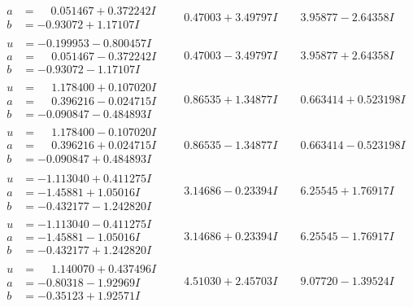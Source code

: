 \documentclass[1p]{elsarticle_modified}
\theoremstyle{definition}
\begin{document}
$$\begin{array}{c|c|c}
\begin{aligned}
a &= \phantom{-}0.051467 + 0.372242 I \\
b &= -0.93072 + 1.17107 I\end{aligned}
 & \phantom{-}0.47003 + 3.49797 I & \phantom{-}3.95877 - 2.64358 I \\ \hline\begin{aligned}
u &= -0.199953 - 0.800457 I \\
a &= \phantom{-}0.051467 - 0.372242 I \\
b &= -0.93072 - 1.17107 I\end{aligned}
 & \phantom{-}0.47003 - 3.49797 I & \phantom{-}3.95877 + 2.64358 I \\ \hline\begin{aligned}
u &= \phantom{-}1.178400 + 0.107020 I \\
a &= \phantom{-}0.396216 - 0.024715 I \\
b &= -0.090847 - 0.484893 I\end{aligned}
 & \phantom{-}0.86535 + 1.34877 I & \phantom{-}0.663414 + 0.523198 I \\ \hline\begin{aligned}
u &= \phantom{-}1.178400 - 0.107020 I \\
a &= \phantom{-}0.396216 + 0.024715 I \\
b &= -0.090847 + 0.484893 I\end{aligned}
 & \phantom{-}0.86535 - 1.34877 I & \phantom{-}0.663414 - 0.523198 I \\ \hline\begin{aligned}
u &= -1.113040 + 0.411275 I \\
a &= -1.45881 + 1.05016 I \\
b &= -0.432177 - 1.242820 I\end{aligned}
 & \phantom{-}3.14686 - 0.23394 I & \phantom{-}6.25545 + 1.76917 I \\ \hline\begin{aligned}
u &= -1.113040 - 0.411275 I \\
a &= -1.45881 - 1.05016 I \\
b &= -0.432177 + 1.242820 I\end{aligned}
 & \phantom{-}3.14686 + 0.23394 I & \phantom{-}6.25545 - 1.76917 I \\ \hline\begin{aligned}
u &= \phantom{-}1.140070 + 0.437496 I \\
a &= -0.80318 - 1.92969 I \\
b &= -0.35123 + 1.92571 I\end{aligned}
 & \phantom{-}4.51030 + 2.45703 I & \phantom{-}9.07720 - 1.39524 I \\ \hline\begin{aligned}

\end{aligned}
\end{array}$$
\end{document}
